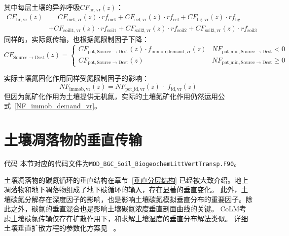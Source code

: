 其中每层土壤的异养呼吸$CF_{\mathrm{hr,vr}}\left(z\right)$：
\begin{equation}
  \begin{aligned}
    C F_{\mathrm{h r, vr}}(z)&=C F_{\mathrm{met, vr}}(z) \cdot r f_{\mathrm{met}}+C F_{\mathrm{cel, vr}}(z) \cdot r f_{\mathrm{cel}}+C F_{\mathrm{lig, vr}}(z) \cdot r f_{\mathrm{lig}} \\
    &+C F_{\mathrm{{soill } 1, vr}}(z) \cdot r f_{\mathrm{{soil1 }}}+C F_{\mathrm{{soil2,vr }}}(z) \cdot r f_{\mathrm{{soil2 }}}+C F_{\mathrm{{soil3,vr }}}(z) \cdot r f_{\mathrm{{soil3 }}}
  \end{aligned}
\end{equation}
同样的，实际氮传输，也根据氮限制因子下降：
\begin{equation}
  CF_{\mathrm{Source \rightarrow Dest}}(z)=\left\{\begin{array}{ll} CF_{\mathrm{pot, Source \rightarrow Dest}}(z) \cdot f_{\mathrm{immob\_demand, vr}}(z) & NF_{\mathrm{pot\_{min, Source \rightarrow Dest}}} <0 \\
      CF_{\mathrm{pot, Source \rightarrow Dest}}(z) & NF_{\mathrm{pot\_{min, Source\rightarrow Dest}}} \geqslant 0
  \end{array}\right.
\end{equation}

实际土壤氮固化作用同样受氮限制因子的影响：
\begin{equation}
  NF_{\mathrm{immob,vr}}(z)=NF_{\mathrm{pot\_id,vr}}(z)\ \cdot\ f_{\mathrm{id,vr}}(z)
\end{equation}
但因为氮矿化作用为土壤提供无机氮，实际的土壤氮矿化作用仍然运用公式~\eqref{NF_immob_demand_vr}。


\section{土壤凋落物的垂直传输}\label{土壤凋落物的垂直传输}
\begin{mymdframed}{代码}
  本节对应的代码文件为\texttt{MOD\_BGC\_Soil\_BiogeochemLittVertTransp.F90}。
\end{mymdframed}
土壤凋落物的碳氮循环的垂直结构在章节~\ref{垂直分层结构} 已经被大致介绍。地上凋落物和地下凋落物组成了地下碳循环的输入，存在显著的垂直变化。
此外，土壤碳氮分解存在深度因子的影响，也是影响土壤碳氮模拟垂直分布的重要因子。除此之外，碳氮的垂直混合也是影响土壤碳氮浓度垂直剖面曲线的关键。
CoLM考虑土壤碳氮传输仅存在扩散作用下，和求解土壤湿度的垂直分布解法类似。
详细土壤垂直扩散方程的参数化方案见~\citet{koven2009formation,koven2011permafrost,koven2013effect,koven2015permafrost} 。

